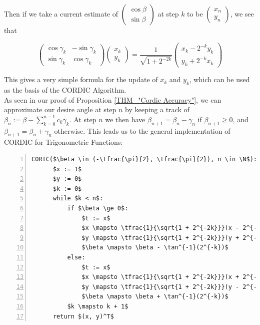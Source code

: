 {Then if we take a current estimate of \(\left(\begin{array}{c}\cos\beta\\\sin\beta\end{array}\right)\) at step \(k\) to be \(\left(\begin{array}{c}x_n\\y_n\end{array}\right)\), we see that

\begin{displaymath}
	\left(\begin{array}{cc}
		\cos\gamma_k & - \sin\gamma_k\\
		\sin\gamma_k & \cos\gamma_k
	\end{array}\right)
	\left(\begin{array}{c}
		x_k \\ y_k
	\end{array}\right)
	= \frac{1}{\sqrt{1 + 2^{-2k}}}
	\left(\begin{array}{c}
		x_k - 2^{-k}y_k\\
		y_k + 2^{-k}x_k
	\end{array}\right)
\end{displaymath}

This gives a very simple formula for the update of \(x_k\) and \(y_k\), which can be used as the basis of the CORDIC Algorithm.\\

As seen in our proof of Proposition \ref{THM_"Cordic Accuracy"}, we can approximate our desire angle at step \(n\) by keeping a track of \(\beta_n := \beta - \sum_{k=0}^{n-1}c_k\gamma_k\). At step \(n\) we then have \(\beta_{n+1} = \beta_n - \gamma_n\) if \(\beta_{n+1} \ge 0\), and \(\beta_{n+1} = \beta_n + \gamma_n\) otherwise. This leads us to the general implementation of CORDIC for Trigonometric Functions:

\begin{lstlisting}[numbers=left,frame=single,mathescape,caption={General Cordic},label={PCD_"General_Cordic"}]
  CORIC($\beta \in (-\tfrac{\pi}{2}, \tfrac{\pi}{2}), n \in \N$):
      $x := 1$
      $y := 0$
      $k := 0$
      while $k < n$:
          if $\beta \ge 0$:
              $t := x$
              $x \mapsto \tfrac{1}{\sqrt{1 + 2^{-2k}}}(x - 2^{-k}y)$
              $y \mapsto \tfrac{1}{\sqrt{1 + 2^{-2k}}}(y + 2^{-k}t)$
              $\beta \mapsto \beta - \tan^{-1}(2^{-k})$
          else:
              $t := x$
              $x \mapsto \tfrac{1}{\sqrt{1 + 2^{-2k}}}(x + 2^{-k}y)$
              $y \mapsto \tfrac{1}{\sqrt{1 + 2^{-2k}}}(y - 2^{-k}t)$
              $\beta \mapsto \beta + \tan^{-1}(2^{-k})$
          $k \mapsto k + 1$
      return $(x, y)^T$
\end{lstlisting}

}
